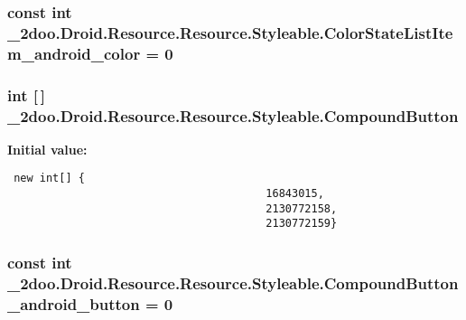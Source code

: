 \hypertarget{class__2doo_1_1_droid_1_1_resource_1_1_styleable_63cc216593bfffbcf7a45f1c678c152e}{
\subsubsection[{ColorStateListItem\_\-android\_\-color}]{\setlength{\rightskip}{0pt plus 5cm}const int \_\-2doo.Droid.Resource.Resource.Styleable.ColorStateListItem\_\-android\_\-color = 0}}
\label{class__2doo_1_1_droid_1_1_resource_1_1_styleable_63cc216593bfffbcf7a45f1c678c152e}


\hypertarget{class__2doo_1_1_droid_1_1_resource_1_1_styleable_61dd3fd9e969a4bd18b5745feade560e}{
\subsubsection[{CompoundButton}]{\setlength{\rightskip}{0pt plus 5cm}int \mbox{[}$\,$\mbox{]} \_\-2doo.Droid.Resource.Resource.Styleable.CompoundButton}}
\label{class__2doo_1_1_droid_1_1_resource_1_1_styleable_61dd3fd9e969a4bd18b5745feade560e}


\textbf{Initial value:}

\begin{Code}\begin{verbatim} new int[] {
                                        16843015,
                                        2130772158,
                                        2130772159}
\end{verbatim}
\end{Code}
\hypertarget{class__2doo_1_1_droid_1_1_resource_1_1_styleable_f9d9bb3b689aca82caa5609d5e6225e0}{
\subsubsection[{CompoundButton\_\-android\_\-button}]{\setlength{\rightskip}{0pt plus 5cm}const int \_\-2doo.Droid.Resource.Resource.Styleable.CompoundButton\_\-android\_\-button = 0}}
\label{class__2doo_1_1_droid_1_1_resource_1_1_styleable_f9d9bb3b689aca82caa5609d5e6225e0}


